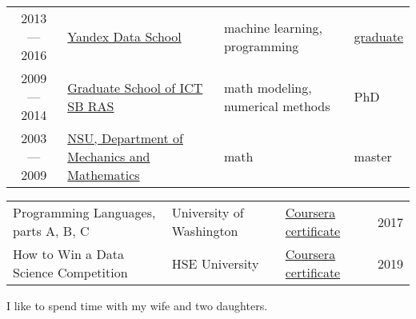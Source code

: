 \documentclass[11pt]{article}
\begin{document}
\begin{longtable} {cp{}p{}l}
2013 — 2016	& \href{https://academy.yandex.ru/dataschool}{Yandex Data School} & machine learning, programming & \href{https://academy.yandex.ru/dataschool/graduates}{graduate} \vspace{0.25em}\\
2009 — 2014	& \href{http://www.ict.nsc.ru/ru/education/postgraduate}{Graduate School of ICT SB RAS} & math modeling, numerical methods & PhD \vspace{0.25em}\\
2003 — 2009	& \href{https://english.nsu.ru/}{NSU, Department of Mechanics and Mathematics} & math & master \vspace{0.25em}\\
\end{longtable}

\begin{longtable}{p{}p{}ll}
	Programming Languages, parts A, B, C &
	University of Washington & \href{https://coursera.org/share/3e187e640ed6df57b0a84ecb8a82ddab}{ Coursera certificate }& 2017 \vspace{0.5em}\\
	How to Win a Data Science Competition & HSE University & \href{https://coursera.org/share/0ad3f02a08a405800c29d5909caece90}{ Coursera certificate } & 2019 \vspace{0.5em}\\
\end{longtable}
	
\vspace{-1em}

I like to spend time with my wife and two daughters.
\end{document}
